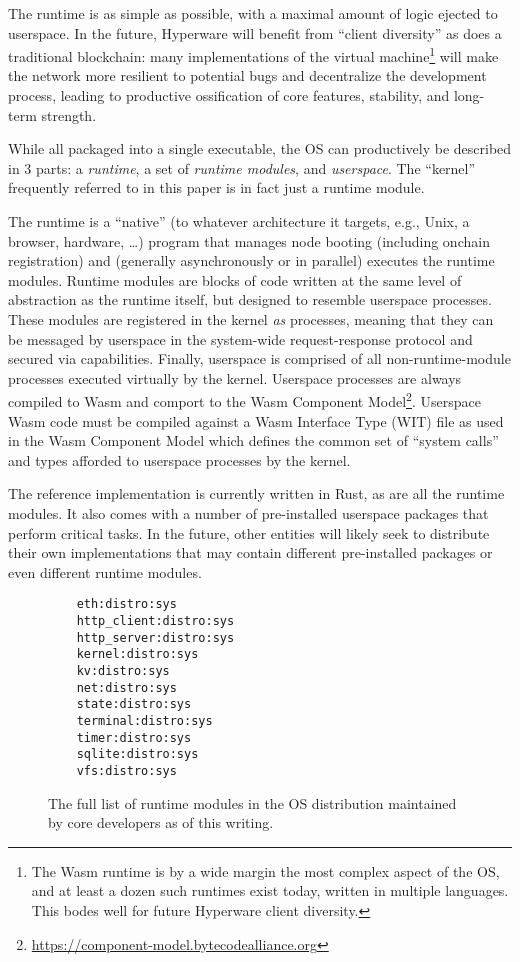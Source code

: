\documentclass[runningheads]{llncs}
\begin{document}
The runtime is as simple as possible, with a maximal amount of logic ejected to userspace.
In the future, Hyperware will benefit from ``client diversity'' as does a traditional blockchain: many implementations of the virtual machine\footnote{The Wasm runtime is by a wide margin the most complex aspect of the OS, and at least a dozen such runtimes exist today, written in multiple languages.
This bodes well for future Hyperware client diversity.}
will make the network more resilient to potential bugs and decentralize the development process, leading to productive ossification of core features, stability, and long-term strength.

While all packaged into a single executable, the OS can productively be described in 3 parts: a \textit{runtime}, a set of \textit{runtime modules}, and \textit{userspace}.
The ``kernel'' frequently referred to in this paper is in fact just a runtime module.

The runtime is a ``native'' (to whatever architecture it targets, e.g., Unix, a browser, hardware, \ldots) program that manages node booting (including onchain registration) and (generally asynchronously or in parallel) executes the runtime modules.
Runtime modules are blocks of code written at the same level of abstraction as the runtime itself, but designed to resemble userspace processes.
These modules are registered in the kernel \textit{as} processes, meaning that they can be messaged by userspace in the system-wide request-response protocol and secured via capabilities.
Finally, userspace is comprised of all non-runtime-module processes executed virtually by the kernel.
Userspace processes are always compiled to Wasm and comport to the Wasm Component Model\footnote{\url{https://component-model.bytecodealliance.org}}.
Userspace Wasm code must be compiled against a Wasm Interface Type (WIT) file as used in the Wasm Component Model which defines the common set of ``system calls'' and types afforded to userspace processes by the kernel.

The reference implementation is currently written in Rust, as are all the runtime modules.
It also comes with a number of pre-installed userspace packages that perform critical tasks.
In the future, other entities will likely seek to distribute their own implementations that may contain different pre-installed packages or even different runtime modules.

\begin{figure}
    \centering
    \begin{lstlisting}
    eth:distro:sys
    http_client:distro:sys
    http_server:distro:sys
    kernel:distro:sys
    kv:distro:sys
    net:distro:sys
    state:distro:sys
    terminal:distro:sys
    timer:distro:sys
    sqlite:distro:sys
    vfs:distro:sys
    \end{lstlisting}
    \caption{The full list of runtime modules in the OS distribution maintained by core developers as of this writing.}
    \label{fig:runtime modules list}
\end{figure}
\end{document}
